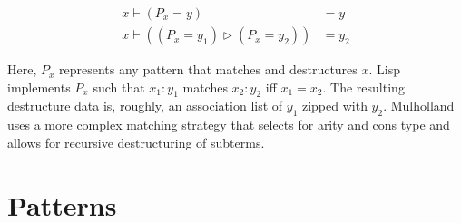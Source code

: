 \documentclass{report}
\begin{document}
\begin{align*}
x \vdash (P_x = y)                      & = y \\
x \vdash ((P_x = y_1) \rhd (P_x = y_2)) & = y_2
\end{align*}

  Here, $P_x$ represents any pattern that matches and destructures $x$. Lisp implements $P_x$ such that $x_1:y_1$ matches $x_2:y_2$ iff $x_1 = x_2$. The resulting destructure data is, roughly,
  an association list of $y_1$ zipped with $y_2$. Mulholland uses a more complex matching strategy that selects for arity and cons type and allows for recursive destructuring of subterms.

\section{Patterns}
\end{document}
